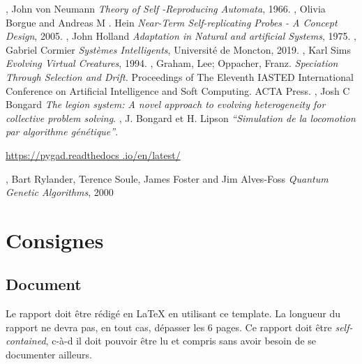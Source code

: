 \documentclass[journal, a4paper]{IEEEtran}
\begin{document}
%
%
%
\begin{thebibliography}{99}
	 , John von Neumann \textit{Theory of
	Self
	-Reproducing Automata}, 1966.
	 , Olivia Borgue and Andreas M
	. Hein \textit{Near-Term Self-replicating Probes - A Concept Design}, 2005.
	 , John Holland \textit{Adaptation in
	Natural
	and artificial Systems}, 1975.
	 , Gabriel Cormier \textit{Systèmes Intelligents}, Université de Moncton, 2019.
	 , Karl Sims \textit{Evolving Virtual Creatures}, 1994.
	 , Graham, Lee; Oppacher, Franz. \textit{
	Speciation Through Selection and Drift. } Proceedings of The Eleventh IASTED International Conference on Artificial Intelligence and Soft Computing. ACTA Press.
	 , Josh C Bongard \textit{The legion
	system: A novel approach to evolving heterogeneity for collective problem solving}.
	 , J. Bongard et H. Lipson \textit{“Simulation de la locomotion par algorithme génétique”}.

	 \url{https://pygad.readthedocs
	.io/en/latest/}

	 , Bart Rylander, Terence Soule,
	James Foster and Jim Alves-Foss \textit{Quantum Genetic Algorithms}, 2000
\end{thebibliography}


\newpage

\appendices
\section{Consignes}
\subsection*{Document}
	Le rapport doit être rédigé en \LaTeX{} en utilisant ce template.
	La longueur du rapport ne devra pas, en tout cas, dépasser les 6 pages.
	Ce rapport doit être \emph{self-contained}, c-à-d il doit pouvoir être lu et compris sans avoir besoin de se documenter ailleurs.



\end{document}

